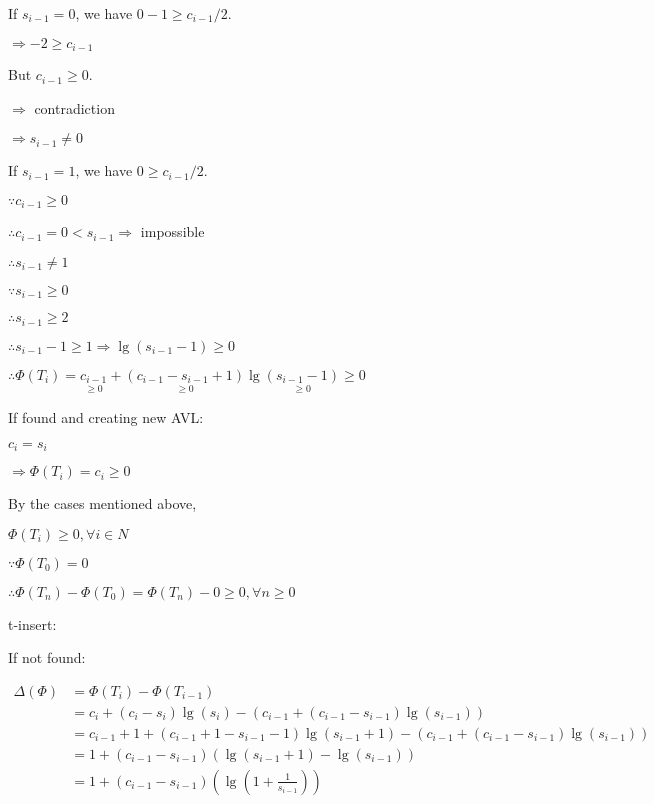 \documentclass[12pt]{article}
\begin{document}
If  $  s_{i-1}=0$, we have $0-1 \geqslant c_{i-1} / 2$.

$\Rightarrow-2 \geqslant c_{i-1} $

But $c_{i-1} \geqslant 0$.

$ \Rightarrow$ contradiction

$ \Rightarrow s_{i-1} \neq 0 $

If  $  s_{i-1}=1$, we have $0 \geqslant c_{i-1} / 2$.

$\because c_{i-1} \geqslant 0$

$\therefore c_{i-1}=0<s_{i-1} \Rightarrow $ impossible

$ \therefore s_{i-1}\ne 1 $

$ \because s_{i-1} \geqslant 0 $

$ \therefore s_{i-1} \geqslant 2 $

$ \therefore s_{i-1}-1 \geqslant 1 \Rightarrow \lg \left(s_{i-1}-1\right) \geqslant 0 $

$ \therefore \Phi\left(T_i\right)=\underset{\geqslant 0}{c_{i-1}}+\underset{\geqslant 0}{\left(c_{i-1}-s_{i-1}+1\right)}\lg\underset{\geqslant 0}{\left(s_{i-1}-1\right)} \geqslant 0$

If found and creating new AVL:

$ c_i=s_i $

$\Rightarrow  \Phi\left(T_i\right)=c_i \geqslant 0$



By the cases mentioned above,

$ \Phi\left(T_i\right) \geqslant 0, \forall i \in  N $

$ \because \Phi\left(T_0\right)=0 $

$ \therefore \Phi\left(T_n\right)-\Phi\left(T_0\right)=\Phi\left(T_n\right)-0 \geqslant 0, \forall n \geqslant 0$


t-insert:

If not found:

$\begin{aligned}
   \Delta ( \Phi)&=\Phi\left(T_i\right)-\Phi\left(T_{i-1}\right) \\
  & =c_i+\left(c_{i}-s_i\right) \lg \left(s_i\right)-\left(c_{i-1}+\left(c_{i-1}-s_{i-1}\right) \lg \left(s_{i-1}\right)\right)\\
& =c_{i-1}+1+\left(c_{i-1}+1-s_{i-1}-1\right) \lg \left(s_{i-1}+1\right)-\left(c_{i-1}+\left(c_{i-1}-s_{i-1}\right) \lg \left(s_{i-1}\right)\right) \\
& =1+\left(c_{i-1}-s_{i-1}\right)\left(\lg \left(s_{i-1}+1\right)-\lg \left(s_{i-1}\right)\right) \\
&=1+\left(c_{i-1}-s_{i-1}\right)\left(\lg \left(1+\frac{1}{s_{i-1}}\right)\right)  
\end{aligned}  $
\end{document}
